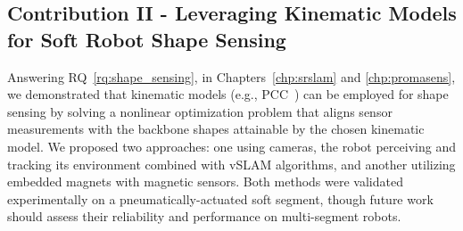 \subsection{Contribution II - Leveraging Kinematic Models for Soft Robot Shape Sensing}
Answering \gls{RQ}~\ref{rq:shape_sensing}, in Chapters~\ref{chp:srslam} and \ref{chp:promasens}, we demonstrated that kinematic models (e.g., \gls{PCC}~\citep{webster2010design}) can be employed for shape sensing by solving a nonlinear optimization problem that aligns sensor measurements with the backbone shapes attainable by the chosen kinematic model. We proposed two approaches: one using cameras, the robot perceiving and tracking its environment combined with \gls{vSLAM} algorithms, and another utilizing embedded magnets with magnetic sensors. Both methods were validated experimentally on a pneumatically-actuated soft segment, though future work should assess their reliability and performance on multi-segment robots.
